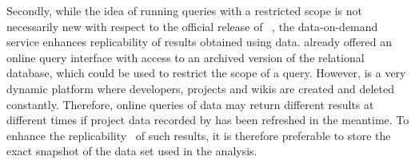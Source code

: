 Secondly, while the idea of running queries with a restricted scope is not necessarily new with respect to
the official release of \linebreak \ght~\cite{gousios2013ghtorent}, the data-on-demand service enhances replicability
of results obtained using \ght data. 
\ght already offered an online query interface with access to an archived version of the relational database, 
which could be used to restrict the scope of a query.
However, \gh is a very dynamic platform where developers, projects and wikis are created and deleted constantly.
Therefore, online queries of \ght data may return different results at different times if project data recorded
by \ght has been refreshed in the meantime.
To enhance the replicability~\cite{gonzalez2012reproducibility} of such results, it is therefore preferable to 
store the exact snapshot of the data set used in the analysis.


%
%





